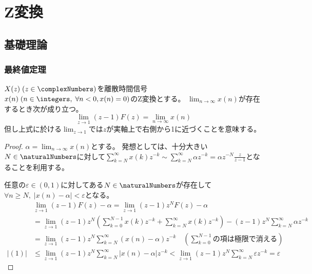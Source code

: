 \part{Z変換}
	\chapter{基礎理論}
		\section{最終値定理}
			\begin{shadebox}
				$X(z)\;(z\in\complexNumbers)$を離散時間信号$x(n)\;(n \in \integers,\;\forall n<0,x(n)=0)$のZ変換とする。
				$\lim_{n\to\infty} x(n)$が存在するとき次が成り立つ。
				\[ \lim_{z\to1}(z-1)F(z) = \lim_{n\to\infty} x(n) \]
				但し上式に於ける$\lim_{z\to1}$では$z$が実軸上で右側から1に近づくことを意味する。
			\end{shadebox}
			\begin{proof}
				\quad\par
				$\alpha = \lim_{n\to\infty} x(n)$とする。
				発想としては、十分大きい$N\in\naturalNumbers$に対して$\sum_{k=N}^\infty x(k)z^{-k} \sim \sum_{k=N}^\infty \alpha z^{-k} = \alpha z^{-N}\frac{z}{z-1}$となることを利用する。
				\par
				任意の$\varepsilon \in (0,1)$に対してある$N\in\naturalNumbers$が存在して$\forall n\geq N,\;|x(n)-\alpha|<\varepsilon$となる。
				\begin{align}
					\quad &\lim_{z\to1}(z-1)F(z) - \alpha = \lim_{z\to1}(z-1)z^N F(z) - \alpha \nonumber \\
					&= \lim_{z\to1}(z-1)z^N\left(\sum_{k=0}^{N-1} x(k)z^{-k} + \sum_{k=N}^\infty x(k)z^{-k}\right) - (z-1)z^N\sum_{k=N}^\infty \alpha z^{-k} \nonumber \\
					&= \lim_{z\to1}(z-1)z^N \sum_{k=N}^\infty (x(n) - \alpha)z^{-k} \quad \left(\sum_{k=0}^{N-1}\text{の項は極限で消える}\right) \\
					|(1)| &\leq \lim_{z\to1}(z-1)z^N \sum_{k=N}^\infty |x(n) - \alpha|z^{-k} < \lim_{z\to1}(z-1)z^N \sum_{k=N}^\infty \varepsilon z^{-k} = \varepsilon \nonumber
				\end{align}
			\end{proof}

